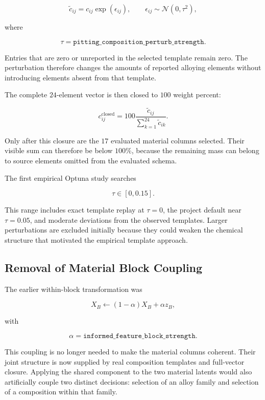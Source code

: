 \documentclass{article}
\begin{document}
\begin{equation}
\widetilde c_{ij}
=
c_{ij}\exp(\epsilon_{ij}),
\qquad
\epsilon_{ij}
\sim
\mathcal{N}(0,\tau^2),
\label{eq:empirical-composition-perturbation}
\end{equation}

where

\[
\tau
=
\texttt{pitting\_composition\_perturb\_strength}.
\]

Entries that are zero or unreported in the selected template remain zero. The
perturbation therefore changes the amounts of reported alloying elements without
introducing elements absent from that template.

The complete \(24\)-element vector is then closed to \(100\) weight percent:

\begin{equation}
c_{ij}^{\mathrm{closed}}
=
100
\frac{\widetilde c_{ij}}
{\sum_{k=1}^{24}\widetilde c_{ik}}.
\label{eq:empirical-composition-closure}
\end{equation}

Only after this closure are the \(17\) evaluated material columns selected. Their
visible sum can therefore be below \(100\%\), because the remaining mass can
belong to source elements omitted from the evaluated schema.

The first empirical Optuna study searches

\[
\tau\in[0,0.15].
\]

This range includes exact template replay at \(\tau=0\), the project default near
\(\tau=0.05\), and moderate deviations from the observed templates. Larger
perturbations are excluded initially because they could weaken the chemical
structure that motivated the empirical template approach.

\subsection{Removal of Material Block Coupling}

The earlier within-block transformation was

\[
X_B
\leftarrow
(1-\alpha)X_B+\alpha z_B,
\]

with

\[
\alpha
=
\texttt{informed\_feature\_block\_strength}.
\]

This coupling is no longer needed to make the material columns coherent. Their
joint structure is now supplied by real composition templates and full-vector
closure. Applying the shared component to the two material latents would also
artificially couple two distinct decisions: selection of an alloy family and
selection of a composition within that family.
\end{document}
